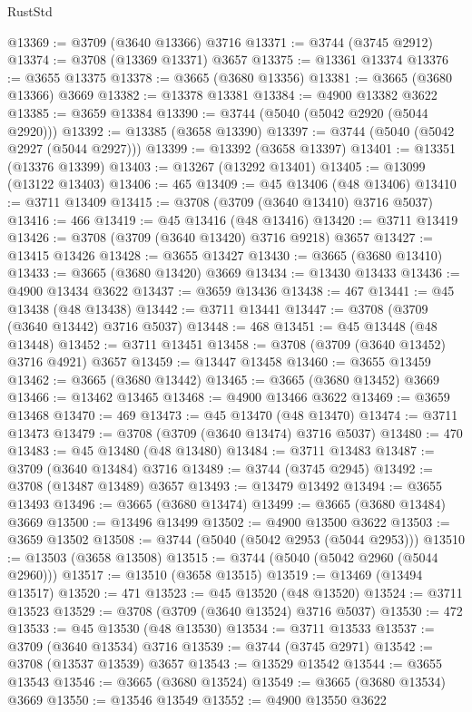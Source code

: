 \begin{lexlean}{RustStd}
\begin{coremodule}
@13369 := @3709 (@3640 @13366) @3716
@13371 := @3744 (@3745 @2912)
@13374 := @3708 (@13369 @13371) @3657
@13375 := @13361 @13374
@13376 := @3655 @13375
@13378 := @3665 (@3680 @13356)
@13381 := @3665 (@3680 @13366) @3669
@13382 := @13378 @13381
@13384 := @4900 @13382 @3622
@13385 := @3659 @13384
@13390 := @3744 (@5040 (@5042 @2920 (@5044 @2920)))
@13392 := @13385 (@3658 @13390)
@13397 := @3744 (@5040 (@5042 @2927 (@5044 @2927)))
@13399 := @13392 (@3658 @13397)
@13401 := @13351 (@13376 @13399)
@13403 := @13267 (@13292 @13401)
@13405 := @13099 (@13122 @13403)
@13406 := 465
@13409 := @45 @13406 (@48 @13406)
@13410 := @3711 @13409
@13415 := @3708 (@3709 (@3640 @13410) @3716 @5037)
@13416 := 466
@13419 := @45 @13416 (@48 @13416)
@13420 := @3711 @13419
@13426 := @3708 (@3709 (@3640 @13420) @3716 @9218) @3657
@13427 := @13415 @13426
@13428 := @3655 @13427
@13430 := @3665 (@3680 @13410)
@13433 := @3665 (@3680 @13420) @3669
@13434 := @13430 @13433
@13436 := @4900 @13434 @3622
@13437 := @3659 @13436
@13438 := 467
@13441 := @45 @13438 (@48 @13438)
@13442 := @3711 @13441
@13447 := @3708 (@3709 (@3640 @13442) @3716 @5037)
@13448 := 468
@13451 := @45 @13448 (@48 @13448)
@13452 := @3711 @13451
@13458 := @3708 (@3709 (@3640 @13452) @3716 @4921) @3657
@13459 := @13447 @13458
@13460 := @3655 @13459
@13462 := @3665 (@3680 @13442)
@13465 := @3665 (@3680 @13452) @3669
@13466 := @13462 @13465
@13468 := @4900 @13466 @3622
@13469 := @3659 @13468
@13470 := 469
@13473 := @45 @13470 (@48 @13470)
@13474 := @3711 @13473
@13479 := @3708 (@3709 (@3640 @13474) @3716 @5037)
@13480 := 470
@13483 := @45 @13480 (@48 @13480)
@13484 := @3711 @13483
@13487 := @3709 (@3640 @13484) @3716
@13489 := @3744 (@3745 @2945)
@13492 := @3708 (@13487 @13489) @3657
@13493 := @13479 @13492
@13494 := @3655 @13493
@13496 := @3665 (@3680 @13474)
@13499 := @3665 (@3680 @13484) @3669
@13500 := @13496 @13499
@13502 := @4900 @13500 @3622
@13503 := @3659 @13502
@13508 := @3744 (@5040 (@5042 @2953 (@5044 @2953)))
@13510 := @13503 (@3658 @13508)
@13515 := @3744 (@5040 (@5042 @2960 (@5044 @2960)))
@13517 := @13510 (@3658 @13515)
@13519 := @13469 (@13494 @13517)
@13520 := 471
@13523 := @45 @13520 (@48 @13520)
@13524 := @3711 @13523
@13529 := @3708 (@3709 (@3640 @13524) @3716 @5037)
@13530 := 472
@13533 := @45 @13530 (@48 @13530)
@13534 := @3711 @13533
@13537 := @3709 (@3640 @13534) @3716
@13539 := @3744 (@3745 @2971)
@13542 := @3708 (@13537 @13539) @3657
@13543 := @13529 @13542
@13544 := @3655 @13543
@13546 := @3665 (@3680 @13524)
@13549 := @3665 (@3680 @13534) @3669
@13550 := @13546 @13549
@13552 := @4900 @13550 @3622

\end{coremodule}
\end{lexlean}
